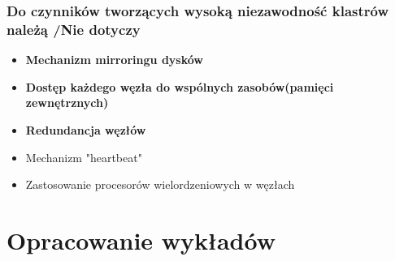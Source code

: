 \documentclass[a4paper,twoside]{article}
\begin{document}
\section{Do czynników tworzących wysoką niezawodność klastrów należą {\small /Nie dotyczy}}
	\begin{itemize}
    \item \textbf{Mechanizm mirroringu dysków}
    \item \textbf{Dostęp każdego węzła do wspólnych zasobów(pamięci zewnętrznych)}
    \item \textbf{Redundancja węzłów}
    \item Mechanizm "heartbeat"
    \item Zastosowanie procesorów wielordzeniowych w węzłach
    \end{itemize}

\newpage
\part*{Opracowanie wykładów}
\end{document}

